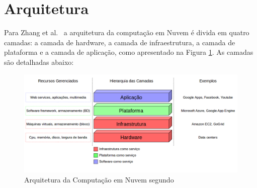 \section{Arquitetura} \label{cloud:arch}

Para Zhang et al.~\citeyearpar{stateOfArt:2010} a arquitetura da computação em Nuvem é divida em quatro camadas: a camada de hardware, a camada de infraestrutura, a camada de plataforma e a camada de aplicação, como apresentado na Figura \ref{architecture1}. As camadas são detalhadas abaixo:

\begin{figure}[htbp]
  \centering \includegraphics[scale=.4]{imgs/architecture1.png}
\caption{Arquitetura da Computação em Nuvem segundo~\citep{stateOfArt:2010}} 
\label{architecture1}
\end{figure}

